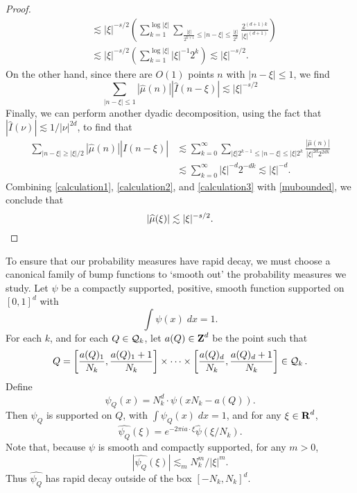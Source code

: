 \begin{proof}
\begin{equation}
\begin{split}
        &\lesssim |\xi|^{-s/2} \left( \sum_{k = 1}^{\log |\xi|} \sum_{\frac{|\xi|}{2^{k+1}} \leq |n - \xi| \leq \frac{|\xi|}{2^{k}}} \frac{2^{(d+1)k}}{|\xi|^{(d+1)}} \right)\\
        &\lesssim |\xi|^{-s/2} \left( \sum_{k = 1}^{\log |\xi|} |\xi|^{-1} 2^k \right) \lesssim |\xi|^{-s/2}.
    \end{split}
    \end{equation}
    On the other hand, since there are $O(1)$ points $n$ with $|n - \xi| \leq 1$, we find
    \begin{equation} \label{calculation2}
        \sum_{|n - \xi| \leq 1} |\widehat{\mu}(n)| |\widehat{I}(n - \xi)| \lesssim |\xi|^{-s/2}
    \end{equation}
    Finally, we can perform another dyadic decomposition, using the fact that $|\widehat{I}(\nu)| \lesssim 1/|\nu|^{2d}$, to find that
    \begin{equation} \label{calculation3}
    \begin{split}
        \sum_{|n - \xi| \geq |\xi|/2} |\widehat{\mu}(n)| |\widehat{I}(n - \xi)| &\lesssim \sum_{k = 0}^\infty \sum_{|\xi| 2^{k-1} \leq |n - \xi| \leq |\xi| 2^k} \frac{|\widehat{\mu}(n)|}{|\xi|^{2d} 2^{2dk}}\\
        &\lesssim \sum_{k = 0}^\infty |\xi|^{-d} 2^{-dk} \lesssim |\xi|^{-d}.
    \end{split}
    \end{equation}
    Combining \eqref{calculation1}, \eqref{calculation2}, and \eqref{calculation3} with \eqref{mubounded}, we conclude that
    \[ |\widehat{\mu}(\xi)| \lesssim |\xi|^{-s/2}. \qedhere \]
\end{proof}

To ensure that our probability measures have rapid decay, we must choose a canonical family of bump functions to `smooth out' the probability measures we study. Let $\psi$ be a compactly supported, positive, smooth function supported on $[0,1]^d$ with
%
\[ \int \psi(x)\; dx = 1. \]
%
For each $k$, and for each $Q \in \operatorname{\mathcal{Q}}_k$, let $a(Q) \in \operatorname{\mathbf{Z}}^d$ be the point such that
%
\[ Q = \left[ \frac{a(Q)_1}{N_k}, \frac{a(Q)_1 + 1}{N_k} \right] \times \dots \times \left[ \frac{a(Q)_d}{N_k}, \frac{a(Q)_d + 1}{N_k} \right] \in \operatorname{\mathcal{Q}}_k. \]
%
Define
%
\[ \psi_Q(x) = N_k^d \cdot \psi(x N_k - a(Q)). \]
%
Then $\psi_Q$ is supported on $Q$, with $\int \psi_Q(x)\; dx = 1$, and for any $\xi \in \operatorname{\mathbf{R}}^d$,
%
\[ \widehat{\psi_Q}(\xi) = e^{- 2 \pi i a \cdot \xi} \widehat{\psi}(\xi/N_k). \]
%
Note that, because $\psi$ is smooth and compactly supported, for any $m > 0$,
%
\[ |\widehat{\psi_Q}(\xi)| \lesssim_m N_k^m / |\xi|^m. \]
%
Thus $\widehat{\psi_Q}$ has rapid decay outside of the box $[-N_k,N_k]^d$.

